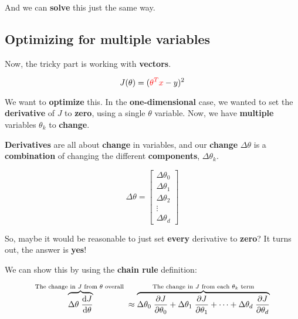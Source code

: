         And we can \textbf{solve} this just the same way.
        
    \subsection*{Optimizing for multiple variables}
    
        Now, the tricky part is working with \textbf{vectors}.
        
        \begin{equation}
            J(\theta) = (\textcolor{red}{ \theta^T x  } - y )^2
        \end{equation}
        
        We want to \textbf{optimize} this. In the \textbf{one-dimensional} case, we wanted to set the \textbf{derivative} of $J$ to \textbf{zero}, using a single $\theta$ variable. Now, we have \textbf{multiple} variables $\theta_k$ to \textbf{change}.
        
        \textbf{Derivatives} are all about \textbf{change} in variables, and our \textbf{change} $\Delta \theta$ is a \textbf{combination} of changing the different \textbf{components}, $\Delta \theta_k$. 
        
        \begin{equation}
            \Delta \theta =
            \begin{bmatrix}
                \Delta \theta_0 \\ \Delta \theta_1 \\ \Delta \theta_2 \\ \vdots \\ \Delta \theta_d
            \end{bmatrix}
        \end{equation}
        
        So, maybe it would be reasonable to just set \textbf{every} derivative to \textbf{zero}? It turns out, the answer is \textbf{yes}! 
        
        We can show this by using the \textbf{chain rule} definition:
        
        \begin{equation}
            \overbrace{
                \Delta \theta \; \frac{\dd J}{\dd \theta}} 
            ^{\text{The change in $J$ from $\theta$ overall } }
            \approx 
            \overbrace{
                \Delta \theta_0 \; \frac{\partial J}{\partial \theta_0} + \Delta \theta_1 \; \frac{\partial J}{\partial \theta_1} + \dots + \Delta \theta_d \; \frac{\partial J}{\partial \theta_d}
            }^{\text{The change in $J$ from each $\theta_k$ term} }
        \end{equation}
        
